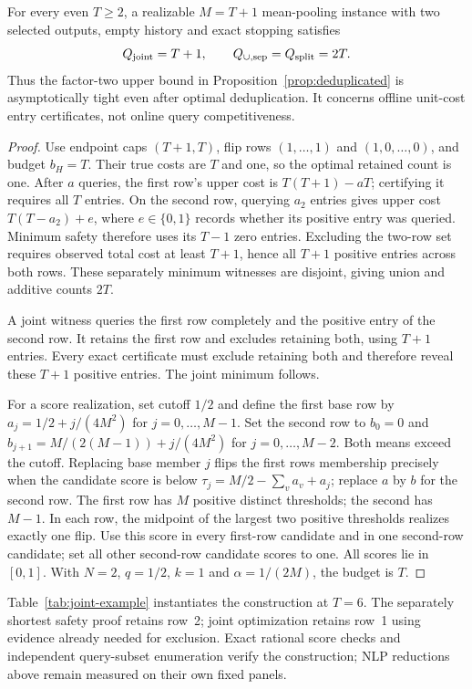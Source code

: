 \begin{proposition}
\label{prop:strict-joint}
For every even $T\ge2$, a realizable $M=T+1$ mean-pooling instance with two selected outputs, empty history and exact stopping satisfies
\[
 Q_{\rm joint}=T+1,\qquad Q_{\cup,\rm sep}=Q_{\rm split}=2T.
\]
Thus the factor-two upper bound in Proposition~\ref{prop:deduplicated} is asymptotically tight even after optimal deduplication. It concerns offline unit-cost entry certificates, not online query competitiveness.
\end{proposition}
\begin{proof}
Use endpoint caps $(T+1,T)$, flip rows $(1,\ldots,1)$ and $(1,0,\ldots,0)$, and budget $b_H=T$. Their true costs are $T$ and one, so the optimal retained count is one. After $a$ queries, the first row's upper cost is $T(T+1)-aT$; certifying it requires all $T$ entries. On the second row, querying $a_2$ entries gives upper cost $T(T-a_2)+e$, where $e\in\{0,1\}$ records whether its positive entry was queried. Minimum safety therefore uses its $T-1$ zero entries. Excluding the two-row set requires observed total cost at least $T+1$, hence all $T+1$ positive entries across both rows. These separately minimum witnesses are disjoint, giving union and additive counts $2T$.

A joint witness queries the first row completely and the positive entry of the second row. It retains the first row and excludes retaining both, using $T+1$ entries. Every exact certificate must exclude retaining both and therefore reveal these $T+1$ positive entries. The joint minimum follows.

For a score realization, set cutoff $1/2$ and define the first base row by $a_j=1/2+j/(4M^2)$ for $j=0,\ldots,M-1$. Set the second row to $b_0=0$ and $b_{j+1}=M/(2(M-1))+j/(4M^2)$ for $j=0,\ldots,M-2$. Both means exceed the cutoff. Replacing base member $j$ flips the first row\textquotesingle s membership precisely when the candidate score is below $\tau_j=M/2-\sum_v a_v+a_j$; replace $a$ by $b$ for the second row. The first row has $M$ positive distinct thresholds; the second has $M-1$. In each row, the midpoint of the largest two positive thresholds realizes exactly one flip. Use this score in every first-row candidate and in one second-row candidate; set all other second-row candidate scores to one. All scores lie in $[0,1]$. With $N=2$, $q=1/2$, $k=1$ and $\alpha=1/(2M)$, the budget is $T$.
\end{proof}
Table~\ref{tab:joint-example} instantiates the construction at $T=6$. The separately shortest safety proof retains row~2; joint optimization retains row~1 using evidence already needed for exclusion. Exact rational score checks and independent query-subset enumeration verify the construction; NLP reductions above remain measured on their own fixed panels.



